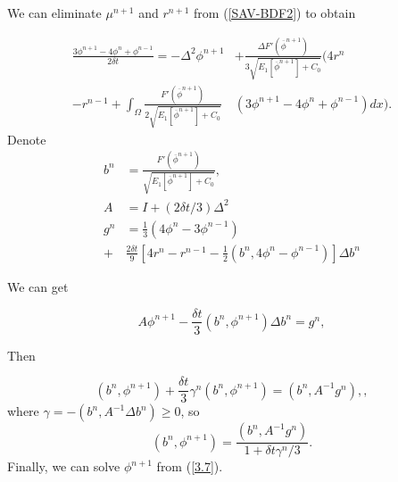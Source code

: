 \documentclass{beamer}
\begin{document}
    \begin{frame}

We can eliminate $\mu^{n+1}$ and $r^{n+1}$ from (\ref{SAV-BDF2}) to obtain

\begin{equation}\label{3.6}
\begin{split}
   \frac{3\phi^{n+1}-4\phi^n+\phi^{n-1}}{2\delta t}=-\Delta^2\phi^{n+1}&+\frac{\Delta F'(\overline{\phi}^{n+1})}{3\sqrt{E_1[\overline{\phi}^{n+1}]+C_0}}(4r^n \\
   -r^{n-1}+\int_{\Omega}\frac{F'(\overline{\phi}^{n+1})}{2\sqrt{E_1[\overline{\phi}^{n+1}]+C_0}}&(3\phi^{n+1}-4\phi^n+\phi^{n-1})dx).
\end{split}
\end{equation}
Denote
\begin{equation}\label{bn}
  \begin{split}
b^n&=\frac{F'(\overline{\phi}^{n+1})}{\sqrt{E_1[\overline{\phi}^{n+1}]+C_0}}, \\
A&=I+(2\delta t/3)\Delta^2 \\
g^n&=\frac{1}{3}(4\phi^n-3\phi^{n-1})\\
+&\frac{2\delta t}{9}[4r^n-r^{n-1}-\frac{1}{2}(b^n,4\phi^n-\phi^{n-1})]\Delta b^n
  \end{split}
\end{equation}


    \end{frame}
    \begin{frame}

We can get

\begin{equation}\label{3.7}
  A\phi^{n+1}-\frac{\delta t}{3}(b^n, \phi^{n+1})\Delta b^n=g^n,
\end{equation}

Then

\begin{equation}\label{3.8}
  (b^n,\phi^{n+1})+\frac{\delta t}{3}\gamma^n(b^n,\phi^{n+1})=(b^n,A^{-1}g^n),,
\end{equation}
where $\gamma=-(b^n,A^{-1}\Delta b^n)\geq 0$, so
\begin{equation}\label{3.9}
  (b^n,\phi^{n+1})=\frac{(b^n,A^{-1}g^n)}{1+\delta t\gamma^n/3}.
\end{equation}
Finally, we can solve $\phi^{n+1}$ from (\ref{3.7}).

    \end{frame}
\end{document}
